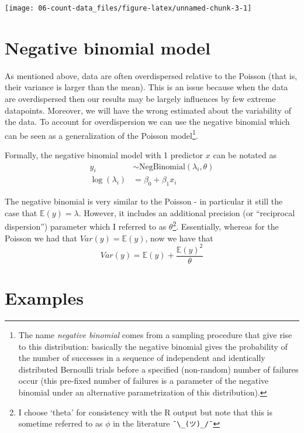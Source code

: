 \documentclass[
]{book}
\begin{document}
\begin{center}\texttt{[image: 06-count-data\_files/figure-latex/unnamed-chunk-3-1]} \end{center}

\section{Negative binomial model}\label{negative-binomial-model}

As mentioned above, data are often overdispersed relative to the Poisson (that is, their variance is larger than the mean). This is an issue because when the data are overdispersed then our results may be largely influences by few extreme datapoints. Moreover, we will have the wrong estimated about the variability of the data. To account for overdispersion we can use the negative binomial which can be seen as a generalization of the Poisson model\footnote{The name \emph{negative binomial} comes from a sampling procedure that give rise to this distribution: basically the negative binomial gives the probability of the number of successes in a sequence of independent and identically distributed Bernoulli trials before a specified (non-random) number of failures occur (this pre-fixed number of failures is a parameter of the negative binomial under an alternative parametrization of this distribution).}.

Formally, the negative binomial model with 1 predictor \(x\) can be notated as
\[
\begin{aligned}
y_i & \sim \text{NegBinomial} \left(\lambda_i, \theta \right)\\
\log( \lambda_i) & = \beta_0 + \beta_1 x_i
\end{aligned}
\]

The negative binomial is very similar to the Poisson - in particular it still the case that \(\mathbb{E}(y)=\lambda\). However, it includes an additional precision (or ``reciprocal dispersion'') parameter which I referred to as \(\theta\)\footnote{I choose `theta' for consistency with the R output but note that this is sometime referred to as \(\phi\) in the literature \texttt{¯\textbackslash{}\_(ツ)\_/¯}}. Essentially, whereas for the Poisson we had that \(Var(y) = \mathbb{E}(y)\), now we have that
\[
Var(y) = \mathbb{E}(y) + \frac{\mathbb{E}(y)^2}{\theta}
\]

\section{Examples}\label{examples}
\end{document}
